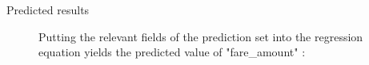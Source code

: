 \documentclass{tikzposter} %
\begin{document}
\begin{columns}
{%
}


{
\begin{description}
  \item[Predicted results]
  Putting the relevant fields of the prediction set into the regression equation yields the predicted value of "fare\_amount" :




  

\end{description}}
\end{columns}
\end{document}
